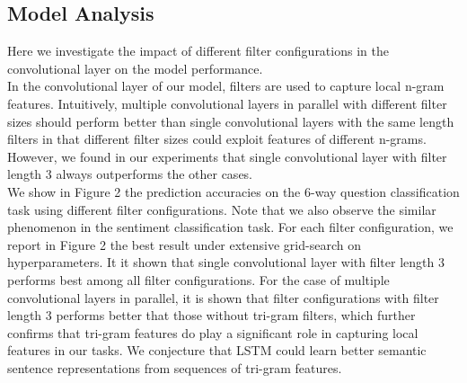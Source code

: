 \documentclass[11pt,letterpaper]{article}
\begin{document}
\subsection{Model Analysis}
Here we investigate the impact of different filter
configurations in the convolutional layer on the model performance. \\
\indent In the convolutional layer of our model, filters are used to
capture local n-gram features. Intuitively, multiple convolutional
layers in parallel with different filter sizes should perform better
than single convolutional layers with the same length filters in that
different filter sizes could exploit features of different n-grams.
However, we found in our experiments that single convolutional layer
with filter length 3 always outperforms the other cases.\\
\indent We show in Figure 2 the prediction accuracies on the 6-way
question classification task using different filter configurations. Note
that we also observe the similar phenomenon in the sentiment
classification task. For each filter configuration, we report in
Figure 2 the best result under extensive grid-search on hyperparameters.
It it shown that single convolutional layer with filter length 3 performs
best among all filter configurations. For the case of multiple
convolutional layers in parallel, it is shown that filter configurations
with filter length 3 performs better that those without tri-gram
filters, which further confirms that tri-gram features do play a
significant role in capturing local features in our tasks. We conjecture
that LSTM could learn better semantic sentence representations from
sequences of tri-gram features.



\end{document}
